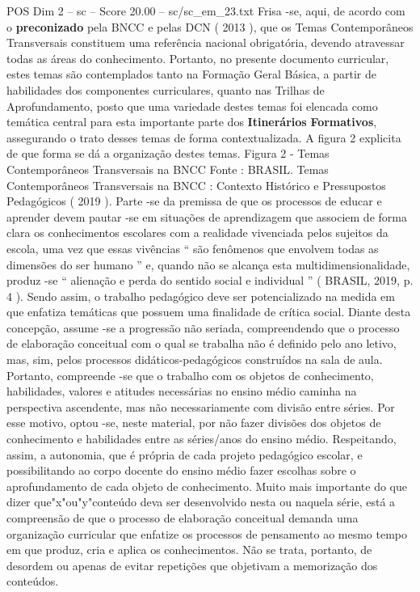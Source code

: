 \begin{textsample}{POS Dim 2 – sc – Score 20.00 – sc/sc\_em\_23.txt}
Frisa -se, aqui, de acordo com o \textbf{preconizado} pela BNCC e pelas DCN ( 2013 ), que os Temas Contemporâneos Transversais constituem uma referência nacional obrigatória, devendo atravessar todas as áreas do conhecimento.
Portanto, no presente documento curricular, estes temas são contemplados tanto na Formação Geral Básica, a partir de habilidades dos componentes curriculares, quanto nas Trilhas de Aprofundamento, posto que uma variedade destes temas foi elencada como temática central para esta importante parte dos \textbf{Itinerários} \textbf{Formativos}, assegurando o trato desses temas de forma contextualizada.
A figura 2 explicita de que forma se dá a organização destes temas.
Figura 2 - Temas Contemporâneos Transversais na BNCC Fonte : BRASIL.
Temas Contemporâneos Transversais na BNCC : Contexto Histórico e Pressupostos Pedagógicos ( 2019 ).
Parte -se da premissa de que os processos de educar e aprender devem pautar -se em situações de aprendizagem que associem de forma clara os conhecimentos escolares com a realidade vivenciada pelos sujeitos da escola, uma vez que essas vivências “ são fenômenos que envolvem todas as dimensões do ser humano ” e, quando não se alcança esta multidimensionalidade, produz -se “ alienação e perda do sentido social e individual ” ( BRASIL, 2019, p. 4 ).
Sendo assim, o trabalho pedagógico deve ser potencializado na medida em que enfatiza temáticas que possuem uma finalidade de crítica social.
Diante desta concepção, assume -se a progressão não seriada, compreendendo que o processo de elaboração conceitual com o qual se trabalha não é definido pelo ano letivo, mas, sim, pelos processos didáticos-pedagógicos construídos na sala de aula.
Portanto, compreende -se que o trabalho com os objetos de conhecimento, habilidades, valores e atitudes necessárias no ensino médio caminha na perspectiva ascendente, mas não necessariamente com divisão entre séries.
Por esse motivo, optou -se, neste material, por não fazer divisões dos objetos de conhecimento e habilidades entre as séries/anos do ensino médio.
Respeitando, assim, a autonomia, que é própria de cada projeto pedagógico escolar, e possibilitando ao corpo docente do ensino médio fazer escolhas sobre o aprofundamento de cada objeto de conhecimento.
Muito mais importante do que dizer que"x"ou"y"conteúdo deva ser desenvolvido nesta ou naquela série, está a compreensão de que o processo de elaboração conceitual demanda uma organização curricular que enfatize os processos de pensamento ao mesmo tempo em que produz, cria e aplica os conhecimentos.
Não se trata, portanto, de desordem ou apenas de evitar repetições que objetivam a memorização dos conteúdos.

\end{textsample}
